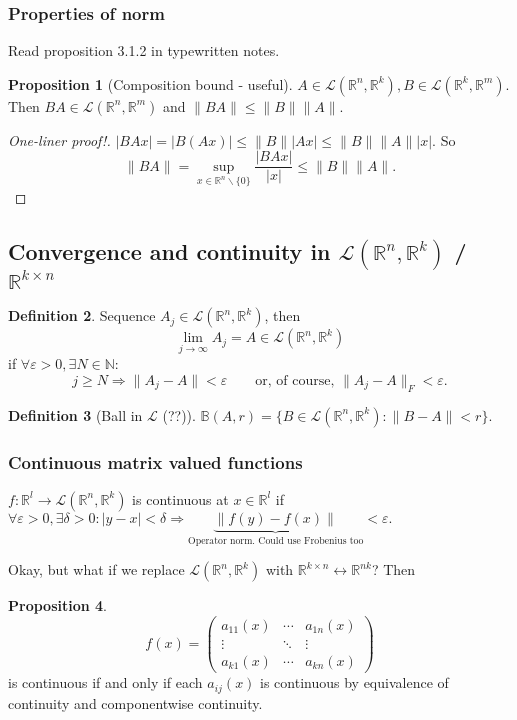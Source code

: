 \documentclass[a4paper]{article}
\theoremstyle{definition}
\newtheorem{defn}{Definition}[subsection]
\newtheorem{prop}[defn]{Proposition}
\begin{document}
\subsubsection{Properties of norm}
Read proposition 3.1.2 in typewritten notes.
\begin{prop}[Composition bound - useful]
$A\in \mathcal L(\mathbb R^n,\mathbb R^k),B\in \mathcal L(\mathbb R^k,\mathbb R^m)$. Then $BA\in \mathcal L(\mathbb R^n,\mathbb R^m)$ and $\|BA\|\leq \|B\|\|A\|$.
\end{prop}
\begin{proof}[One-liner proof!]
$|BAx|=|B(Ax)|\leq \|B\| |Ax| \leq \|B\|\|A\||x|$. So
\[
\|BA\|=\underset{x\in \mathbb R^n\backslash \{0\}}{\sup} \frac{|BAx|}{|x|} \leq \|B\|\|A\|.
\]
\end{proof}

\subsection{Convergence and continuity in $\mathcal L(\mathbb R^n,\mathbb R^k)$ / $\mathbb R^{k\times n}$}
\begin{defn}
Sequence $A_j \in \mathcal L(\mathbb R^n,\mathbb R^k)$, then
\[
\lim_{j\rightarrow \infty} A_j=A \in \mathcal L(\mathbb R^n,\mathbb R^k)
\]
if $\forall \varepsilon >0, \exists N\in \mathbb N:$
\[
j\geq N \Rightarrow \|A_j-A\|<\varepsilon \qquad \text{or, of course, }\|A_j-A\|_F<\varepsilon.
\]
\end{defn}
\begin{defn}[Ball in $\mathcal L$ (??)]
$\mathbb B(A,r)=\{B\in \mathcal L(\mathbb R^n,\mathbb R^k):\|B-A\|<r\}$.
\end{defn}

\subsubsection{Continuous matrix valued functions}
$f:\mathbb R^l\rightarrow \mathcal L(\mathbb R^n,\mathbb R^k)$ is continuous at $x\in \mathbb R^l$ if $\forall \varepsilon>0,\exists \delta>0:|y-x|<\delta \Rightarrow \underbrace{\|f(y)-f(x)\|}_{\text{Operator norm. Could use Frobenius too}}<\varepsilon .$

Okay, but what if we replace $\mathcal L(\mathbb R^n,\mathbb R^k)$ with $\mathbb R^{k\times n}\leftrightarrow \mathbb R^{nk}$? Then \begin{prop}
\[
f(x)=\begin{pmatrix}
    a_{11}(x) & \cdots & a_{1n}(x) \\
    \vdots & \ddots & \vdots \\
    a_{k1}(x) & \cdots & a_{kn}(x)
\end{pmatrix}
\]
is continuous if and only if each $a_{ij}(x)$ is continuous by equivalence of continuity and componentwise continuity.
\end{prop}
\end{document}

